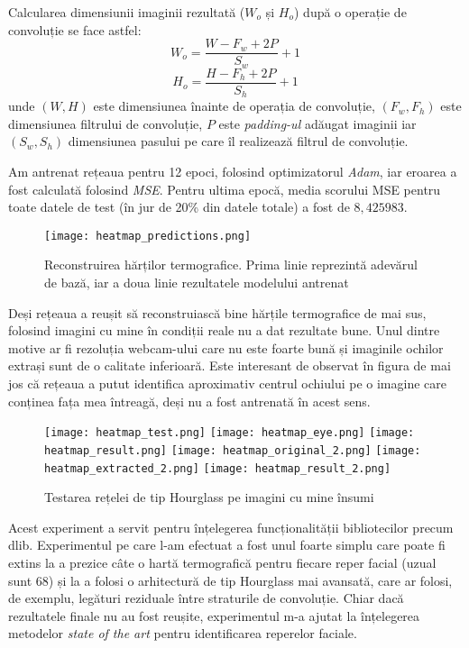 Calcularea dimensiunii imaginii rezultată ($W_o$ și $H_o$) după o operație de convoluție se face astfel:
$$W_o = \frac{W - F_w + 2P}{S_w} + 1$$
$$H_o = \frac{H - F_h + 2P}{S_h} + 1$$
unde $(W, H)$ este dimensiunea înainte de operația de convoluție, $(F_w, F_h)$ este dimensiunea filtrului de convoluție, $P$ este \emph{padding-ul} adăugat imaginii iar $(S_w, S_h)$ dimensiunea pasului pe care îl realizează filtrul de convoluție.

Am antrenat rețeaua pentru 12 epoci, folosind optimizatorul \emph{Adam}, iar eroarea a fost calculată folosind \emph{MSE}.
Pentru ultima epocă, media scorului MSE pentru toate datele de test (în jur de 20\% din datele totale) a fost de $8,425983$.

\begin{figure}[H]
    \centering
    \texttt{[image: heatmap\_predictions.png]}
    \caption{Reconstruirea hărților termografice. Prima linie reprezintă adevărul de bază, iar a doua linie rezultatele modelului antrenat}
\end{figure}

Deși rețeaua a reușit să reconstruiască bine hărțile termografice de mai sus, folosind imagini cu mine în condiții reale nu a dat rezultate bune.
Unul dintre motive ar fi rezoluția webcam-ului care nu este foarte bună și imaginile ochilor extrași sunt de o calitate inferioară.
Este interesant de observat în figura de mai jos că rețeaua a putut identifica aproximativ centrul ochiului pe o imagine care conținea fața mea întreagă, deși nu a fost antrenată în acest sens.

\begin{figure}[h]
    \centering
    \texttt{[image: heatmap\_test.png]}
    \texttt{[image: heatmap\_eye.png]}
    \texttt{[image: heatmap\_result.png]}
    \texttt{[image: heatmap\_original\_2.png]}
    \texttt{[image: heatmap\_extracted\_2.png]}
    \texttt{[image: heatmap\_result\_2.png]}
    \caption{Testarea rețelei de tip Hourglass pe imagini cu mine însumi}
\end{figure}

Acest experiment a servit pentru înțelegerea funcționalității bibliotecilor precum dlib.
Experimentul pe care l-am efectuat a fost unul foarte simplu care poate fi extins la a prezice câte o hartă termografică pentru fiecare reper facial (uzual sunt 68) și la a folosi o arhitectură de tip Hourglass mai avansată, care ar folosi, de exemplu, legături reziduale între straturile de convoluție.
Chiar dacă rezultatele finale nu au fost reușite, experimentul m-a ajutat la înțelegerea metodelor \emph{state of the art} pentru identificarea reperelor faciale.